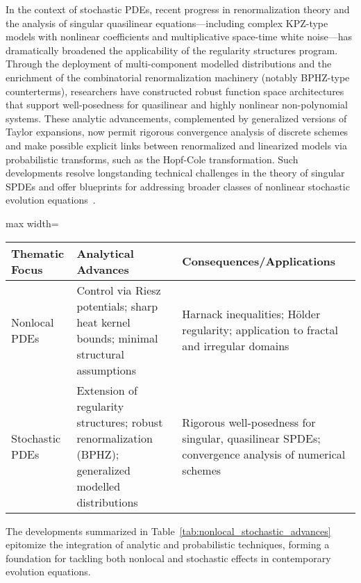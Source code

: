In the context of stochastic PDEs, recent progress in renormalization theory and the analysis of singular quasilinear equations—including complex KPZ-type models with nonlinear coefficients and multiplicative space-time white noise—has dramatically broadened the applicability of the regularity structures program. Through the deployment of multi-component modelled distributions and the enrichment of the combinatorial renormalization machinery (notably BPHZ-type counterterms), researchers have constructed robust function space architectures that support well-posedness for quasilinear and highly nonlinear non-polynomial systems. These analytic advancements, complemented by generalized versions of Taylor expansions, now permit rigorous convergence analysis of discrete schemes and make possible explicit links between renormalized and linearized models via probabilistic transforms, such as the Hopf-Cole transformation. Such developments resolve longstanding technical challenges in the theory of singular SPDEs and offer blueprints for addressing broader classes of nonlinear stochastic evolution equations~\cite{ref94}.

\begin{table*}[htbp]
\centering
\caption{Core Advances in Nonlocal and Stochastic PDE Analysis}
\label{tab:nonlocal_stochastic_advances}
\begin{adjustbox}{max width=\textwidth}
\begin{tabular}{lll}
\toprule
\textbf{Thematic Focus} & \textbf{Analytical Advances} & \textbf{Consequences/Applications} \\
\midrule
Nonlocal PDEs & Control via Riesz potentials; sharp heat kernel bounds; minimal structural assumptions & Harnack inequalities; Hölder regularity; application to fractal and irregular domains \\
Stochastic PDEs & Extension of regularity structures; robust renormalization (BPHZ); generalized modelled distributions & Rigorous well-posedness for singular, quasilinear SPDEs; convergence analysis of numerical schemes \\
\bottomrule
\end{tabular}
\end{adjustbox}
\end{table*}

The developments summarized in Table~\ref{tab:nonlocal_stochastic_advances} epitomize the integration of analytic and probabilistic techniques, forming a foundation for tackling both nonlocal and stochastic effects in contemporary evolution equations.

